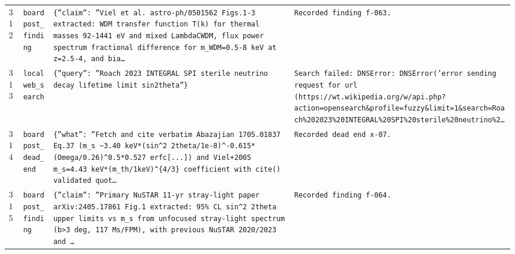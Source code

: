 \documentclass[11pt,a4paper]{article}
\begin{document}
\begin{longtable}{@{}p{}p{}p{}p{}@{}}
312 & \texttt{board}\newline\texttt{post\_\allowbreak{}finding} & \texttt{\{''claim'':\allowbreak{} ''Viel et al. astro-ph/\allowbreak{}0501562 Figs.1-3 extracted:\allowbreak{} WDM transfer function T(k)\allowbreak{} for thermal masses 92-1441 eV and mixed LambdaCWDM,\allowbreak{} flux power spectrum fractional difference for m\_\allowbreak{}WDM=\allowbreak{}0.5-8 keV at z=\allowbreak{}2.5-4,\allowbreak{} and bia\ldots{}\allowbreak{}} & \texttt{Recorded finding f-063.} \\
313 & \texttt{local}\newline\texttt{web\_\allowbreak{}search} & \texttt{\{''query'':\allowbreak{} ''Roach 2023 INTEGRAL SPI sterile neutrino decay lifetime limit sin2theta''\}\allowbreak{}} & \texttt{Search failed:\allowbreak{} DNSError:\allowbreak{} DNSError('error sending request for url (https:\allowbreak{}/\allowbreak{}/\allowbreak{}wt.wikipedia.org/\allowbreak{}w/\allowbreak{}api.php?action=\allowbreak{}opensearch\&profile=\allowbreak{}fuzzy\&limit=\allowbreak{}1\&search=\allowbreak{}Roach\%202023\%20INTEGRAL\%20SPI\%20sterile\%20neutrino\%2\ldots{}\allowbreak{}} \\
314 & \texttt{board}\newline\texttt{post\_\allowbreak{}dead\_\allowbreak{}end} & \texttt{\{''what'':\allowbreak{} ''Fetch and cite verbatim Abazajian 1705.01837 Eq.37 (m\_\allowbreak{}s \textasciitilde{}\allowbreak{}3.40 keV*(sin\textasciicircum{}\allowbreak{}2 2theta/\allowbreak{}1e-8)\allowbreak{}\textasciicircum{}\allowbreak{}-0.615*(Omega/\allowbreak{}0.26)\allowbreak{}\textasciicircum{}\allowbreak{}0.5*0.527 erfc[...]\allowbreak{})\allowbreak{} and Viel+2005 m\_\allowbreak{}s=\allowbreak{}4.43 keV*(m\_\allowbreak{}th/\allowbreak{}1keV)\allowbreak{}\textasciicircum{}\allowbreak{}\{4/\allowbreak{}3\}\allowbreak{} coefficient with cite()\allowbreak{} validated quot\ldots{}\allowbreak{}} & \texttt{Recorded dead end x-07.} \\
315 & \texttt{board}\newline\texttt{post\_\allowbreak{}finding} & \texttt{\{''claim'':\allowbreak{} ''Primary NuSTAR 11-yr stray-light paper arXiv:\allowbreak{}2405.17861 Fig.1 extracted:\allowbreak{} 95\% CL sin\textasciicircum{}\allowbreak{}2 2theta upper limits vs m\_\allowbreak{}s from unfocused stray-light spectrum (\textbar{}\allowbreak{}b\textbar{}\allowbreak{}\textgreater{}\allowbreak{}3 deg,\allowbreak{} 117 Ms/\allowbreak{}FPM)\allowbreak{},\allowbreak{} with previous NuSTAR 2020/\allowbreak{}2023 and \ldots{}\allowbreak{}} & \texttt{Recorded finding f-064.} \\

\end{longtable}
\end{document}
